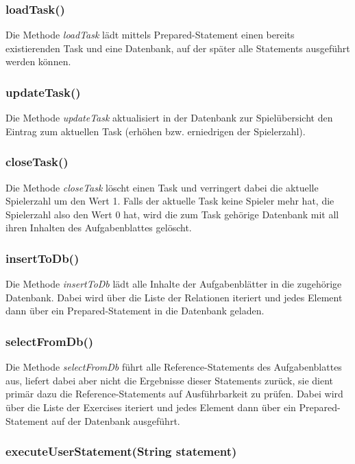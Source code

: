 \documentclass[11pt]{report}
\begin{document}
\subsubsection*{loadTask()}

Die Methode \textit{loadTask} lädt mittels Prepared-Statement einen bereits existierenden Task und eine Datenbank, auf der später alle Statements ausgeführt werden können.

\subsubsection*{updateTask()}

Die Methode \textit{updateTask} aktualisiert in der Datenbank zur Spielübersicht den Eintrag zum aktuellen Task (erhöhen bzw. erniedrigen der Spielerzahl).

\subsubsection*{closeTask()}

Die Methode \textit{closeTask} löscht einen Task und verringert dabei die aktuelle Spielerzahl um den Wert 1. Falls der aktuelle Task keine Spieler mehr hat, die Spielerzahl also den Wert 0 hat, wird die zum Task gehörige Datenbank mit all ihren Inhalten des Aufgabenblattes gelöscht.

\subsubsection*{insertToDb()}

Die Methode \textit{insertToDb} lädt alle Inhalte der Aufgabenblätter in die zugehörige Datenbank. 
Dabei wird über die Liste der Relationen iteriert und jedes Element dann über ein Prepared-Statement in die Datenbank geladen.

\subsubsection*{selectFromDb()}

Die Methode \textit{selectFromDb} führt alle Reference-Statements des Aufgabenblattes aus, liefert dabei aber nicht die Ergebnisse dieser Statements zurück, sie dient primär dazu die Reference-Statements auf Ausführbarkeit zu prüfen.
Dabei wird über die Liste der Exercises iteriert und jedes Element dann über ein Prepared-Statement auf der Datenbank ausgeführt.

\subsubsection*{executeUserStatement(String statement)}
\end{document}
